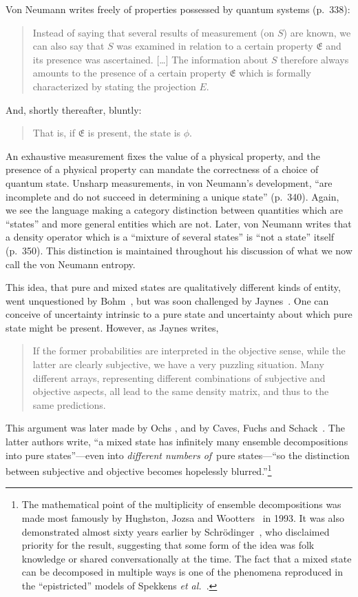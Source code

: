 \documentclass[aps,pra,superscriptaddress,12pt,tightenlines,nofootinbib]{revtex4}
\begin{document}
Von Neumann writes freely of properties possessed by quantum systems
(p.\ 338):
\begin{quotation}
\noindent Instead of saying that several results of measurement (on
$S$) are known, we can also say that $S$ was examined in relation to a
certain property $\mathfrak{E}$ and its presence was
ascertained. [\ldots\!] The information about $S$ therefore always
amounts to the presence of a certain property $\mathfrak{E}$ which is
formally characterized by stating the projection $E$.
\end{quotation}
And, shortly thereafter, bluntly:
\begin{quotation}
\noindent That is, if $\mathfrak{E}$ is present, the state is $\phi$.
\end{quotation}
An exhaustive measurement fixes the value of a physical property, and
the presence of a physical property can mandate the correctness of a
choice of quantum state.  Unsharp measurements, in von Neumann's
development, ``are incomplete and do not succeed in determining a
unique state'' (p.\ 340).  Again, we see the language making a
category distinction between quantities which are ``states'' and more
general entities which are not.  Later, von Neumann writes that a
density operator which is a ``mixture of several states'' is ``not a
state'' itself (p.\ 350).  This distinction is maintained throughout
his discussion of what we now call the von Neumann entropy.

This idea, that pure and mixed states are qualitatively different
kinds of entity, went unquestioned by Bohm~\cite{Bohm1951}, but was soon
challenged by Jaynes~\cite{Jaynes1957}.  One can conceive of
uncertainty intrinsic to a pure state and uncertainty about which pure
state might be present.  However, as Jaynes writes,
\begin{quotation}
\noindent If the former probabilities are interpreted in the objective
sense, while the latter are clearly subjective, we have a very
puzzling situation.  Many different arrays, representing different
combinations of subjective and objective aspects, all lead to the same
density matrix, and thus to the same predictions.
\end{quotation}
This argument was later made by Ochs \cite{Ochs1981}, and by Caves,
Fuchs and Schack~\cite{CFS2001}.  The latter authors write, ``a mixed
state has infinitely many ensemble decompositions into pure
states''---even into \emph{different numbers of}\!\ pure states---``so
the distinction between subjective and objective becomes hopelessly
blurred.''\footnote{The mathematical point of the multiplicity of
  ensemble decompositions was made most famously by Hughston, Jozsa
  and Wootters~\cite{Hughston1993} in 1993.  It was also demonstrated
  almost sixty years earlier by Schr\"odinger~\cite{Schroedinger1936},
  who disclaimed priority for the result, suggesting that some form of
  the idea was folk knowledge or shared conversationally at the time.
  The fact that a mixed state can be decomposed in multiple ways is
  one of the phenomena reproduced in the ``epistricted'' models of
  Spekkens \emph{et al.}\ \cite{Spekkens2007, Spekkens2014}.}
\end{document}
